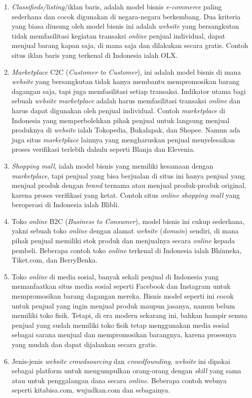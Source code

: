 \begin{enumerate}
	\item \textit{Classifieds/listing}/iklan baris, adalah model bisnis \textit{e-commerce} paling sederhana dan cocok digunakan di negara-negara berkembang. Dua kriteria yang biasa diusung oleh model bisnis ini adalah \textit{website} yang bersangkutan tidak memfasilitasi kegiatan transaksi \textit{online} penjual individual, dapat menjual barang kapan saja, di mana saja dan dilakukan secara gratis. Contoh situs iklan baris yang terkenal di Indonesia ialah OLX.
	\item \textit{Marketplace} C2C (\textit{Customer to Customer}), ini adalah model bisnis di mana \textit{website} yang bersangkutan tidak hanya membantu mempromosikan barang dagangan saja, tapi juga memfasilitasi setiap transaksi. Indikator utama bagi sebuah \textit{website} \textit{marketplace} adalah harus memfasilitasi transaksi \textit{online} dan harus dapat digunakan oleh penjual individual.
	Contoh \textit{marketplace} di Indonesia yang memperbolehkan pihak penjual untuk langsung menjual produknya di \textit{website} ialah Tokopedia, Bukalapak, dan Shopee. Namun ada juga situs \textit{marketplace} lainnya yang mengharuskan penjual menyelesaikan proses verifikasi terlebih dahulu seperti Blanja dan Elevenia.
	\item \textit{Shopping mall}, ialah model bisnis yang memiliki kesamaan dengan \textit{marketplace}, tapi penjual yang bisa berjualan di situs ini hanya penjual yang menjual produk dengan \textit{brand} ternama atau menjual produk-produk original, karena proses verifikasi yang ketat. Contoh situs \textit{online shopping mall} yang beroperasi di Indonesia ialah Blibli.
	\item Toko \textit{online} B2C (\textit{Business to Consumer}), model bisnis ini cukup sederhana, yakni sebuah toko \textit{online} dengan alamat \textit{website} (\textit{domain}) sendiri, di mana pihak penjual memiliki stok produk dan menjualnya secara \textit{online} kepada pembeli.
	Beberapa contoh toko \textit{online} terkenal di Indonesia ialah Bhinneka, Tiket.com, dan BerryBenka.
	\item Toko \textit{online} di media sosial, banyak sekali penjual di Indonesia yang memanfaatkan situs media sosial seperti Facebook dan Instagram untuk mempromosikan barang dagangan mereka. Bisnis model seperti ini cocok untuk penjual yang ingin menjual produk maupun jasanya, namun belum memiliki toko fisik. Tetapi, di era modern sekarang ini, bahkan hampir semua penjual yang sudah memiliki toko fisik tetap menggunakan media sosial sebagai sarana menjual dan mempromosikan barangnya, karena prosesnya yang mudah dan dapat dijalankan secara gratis.
	\item Jenis-jenis \textit{website crowdsourcing} dan \textit{crowdfounding}, \textit{website} ini dipakai sebagai platform untuk mengumpulkan orang-orang dengan \textit{skill} yang sama atau untuk penggalangan dana secara \textit{online}.
	Beberapa contoh webnya seperti kitabisa.com, wujudkan.com dan sebagainya.
\end{enumerate}

